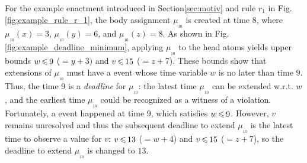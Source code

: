 \begin{examp}
  For the example enactment introduced in Section\:\ref{sec:motiv}
  and rule $r_1$ in Fig.\:\ref{fig:example_rule_r_1},
  the body assignment $\mu_{_{10}\!}$ is created at time $8$,
  where $\mu_{_{10}\!}(x){=}3$,
  $\mu_{_{10}\!}(y){=}6$, and
  $\mu_{_{10}\!}({z}){=}8$.
  As shown in Fig.\:\ref{fig:example_deadline_minimum},
  applying $\mu_{_{10}\!}$ to the head atoms
  yields upper bounds $w\,{\leqslant}\, 9$ (${=}y{+}3)$ and
  $v\,{\leqslant}\, 15$ (${=}{z}{+}7$).
  These bounds show that extensions of $\mu_{_{10}}$
  must have a {\Payment} event whose time variable $w$
  is no later than time $9$.
  Thus, the time $9$ is a {\em deadline} for $\mu_{_{10}}$:
  the latest time $\mu_{_{10}}$ can be extended w.r.t. $w$,
  and the earliest time $\mu_{_{10}}$ 
  could be recognized as a witness of a violation.
  Fortunately,
  a {\Payment} event happened at time $9$,
  which satisfies $w\,{\leqslant}\, 9$.
  However,
  $v$ remains unresolved and thus
  the subsequent deadline to extend $\mu_{_{10}}$ is
  the latest time to observe a value for $v$:
  $v\,{\leqslant}\, 13$ (${=}{w}{+}4$)
  and 
  $v\,{\leqslant}\, 15$ (${=}{z}{+}7$),
  so the deadline to extend $\mu_{_{10}}$ is changed to $13$.
\end{examp}

